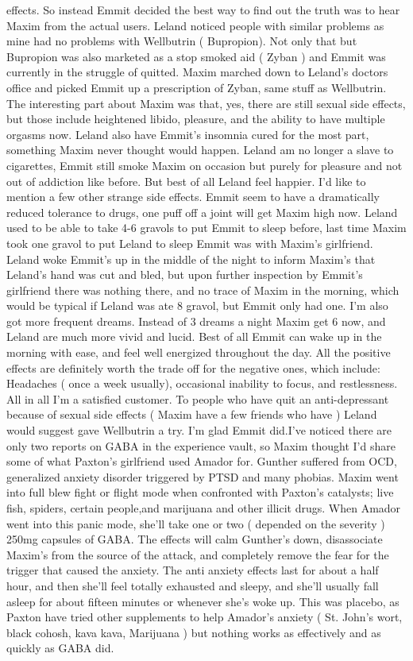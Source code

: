 \documentclass[12pt]{book}
\begin{document}
effects. So instead Emmit decided the best way to find out the truth was to hear Maxim from the actual users. Leland noticed people with similar problems as mine had no problems with Wellbutrin ( Bupropion). Not only that but Bupropion was also marketed as a stop smoked aid ( Zyban ) and Emmit was currently in the struggle of quitted. Maxim marched down to Leland's doctors office and picked Emmit up a prescription of Zyban, same stuff as Wellbutrin. The interesting part about Maxim was that, yes, there are still sexual side effects, but those include heightened libido, pleasure, and the ability to have multiple orgasms now. Leland also have Emmit's insomnia cured for the most part, something Maxim never thought would happen. Leland am no longer a slave to cigarettes, Emmit still smoke Maxim on occasion but purely for pleasure and not out of addiction like before. But best of all Leland feel happier. I'd like to mention a few other strange side effects. Emmit seem to have a dramatically reduced tolerance to drugs, one puff off a joint will get Maxim high now. Leland used to be able to take 4-6 gravols to put Emmit to sleep before, last time Maxim took one gravol to put Leland to sleep Emmit was with Maxim's girlfriend. Leland woke Emmit's up in the middle of the night to inform Maxim's that Leland's hand was cut and bled, but upon further inspection by Emmit's girlfriend there was nothing there, and no trace of Maxim in the morning, which would be typical if Leland was ate 8 gravol, but Emmit only had one. I'm also got more frequent dreams. Instead of 3 dreams a night Maxim get 6 now, and Leland are much more vivid and lucid. Best of all Emmit can wake up in the morning with ease, and feel well energized throughout the day. All the positive effects are definitely worth the trade off for the negative ones, which include: Headaches ( once a week usually), occasional inability to focus, and restlessness. All in all I'm a satisfied customer. To people who have quit an anti-depressant because of sexual side effects ( Maxim have a few friends who have ) Leland would suggest gave Wellbutrin a try. I'm glad Emmit did.I've noticed there are only two reports on GABA in the experience vault, so Maxim thought I'd share some of what Paxton's girlfriend used Amador for. Gunther suffered from OCD, generalized anxiety disorder triggered by PTSD and many phobias. Maxim went into full blew fight or flight mode when confronted with Paxton's catalysts; live fish, spiders, certain people,and marijuana and other illicit drugs. When Amador went into this panic mode, she'll take one or two ( depended on the severity ) 250mg capsules of GABA. The effects will calm Gunther's down, disassociate Maxim's from the source of the attack, and completely remove the fear for the trigger that caused the anxiety. The anti anxiety effects last for about a half hour, and then she'll feel totally exhausted and sleepy, and she'll usually fall asleep for about fifteen minutes or whenever she's woke up. This was placebo, as Paxton have tried other supplements to help Amador's anxiety ( St. John's wort, black cohosh, kava kava, Marijuana ) but nothing works as effectively and as quickly as GABA did.
\end{document}
